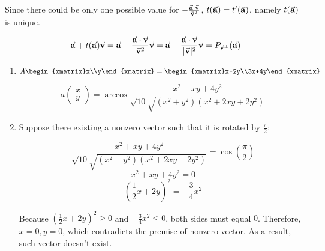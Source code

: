 \begin{exercise}{24}
\begin{enumerate}
         Since there could be only one possible value for $-\frac{\vec{\mathbf{a}} \cdot \vec{\mathbf{v}}}{\vec{\mathbf{v}}^2}$, $t(\vec{\mathbf{a}}) = t'(\vec{\mathbf{a}})$, namely $t(\vec{\mathbf{a}})$ is unique.
         
        $$\vec{\mathbf{a}} + t(\vec{\mathbf{a}})\vec{\mathbf{v}} = \vec{\mathbf{a}} -\frac{\vec{\mathbf{a}} \cdot \vec{\mathbf{v}}}{\vec{\mathbf{v}}^2}\vec{\mathbf{v}} = \vec{\mathbf{a}} - \frac{\vec{\mathbf{a}} \cdot \vec{\mathbf{v}}}{|\vec{\mathbf{v}}|^2}\vec{\mathbf{v}} = P_{\vec{\mathbf{v}}^{\bot}}(\vec{\mathbf{a}})$$
        
        \rQED
  \end{enumerate}
\end{exercise}

\begin{exercise}{26}
  \begin{enumerate}
    \item $$A\begin{xmatrix}x\\y\end{xmatrix} = \begin{xmatrix}x-2y\\3x+4y\end{xmatrix}$$
    
          $$a\begin{pmatrix}x\\y\end{pmatrix} = \arccos{\frac{x^2+xy+4y^2} {\sqrt{10}\sqrt{(x^2+y^2) (x^2+2xy+2y^2)}}}$$
          
    \item Suppose there existing a nonzero vector such that it is rotated by $\frac{\pi}{2}$:
    
          $$\frac{x^2+xy+4y^2} {\sqrt{10}\sqrt{(x^2+y^2) (x^2+2xy+2y^2)}} = \cos(\frac{\pi}{2})$$
          $$x^2+xy+4y^2=0$$
          $$(\frac{1}{2}x+2y)^2=-\frac{3}{4}x^2$$
          
          Because $(\frac{1}{2}x+2y)^2 \geq 0$ and $-\frac{3}{4}x^2 \leq 0$, both sides must equal $0$. Therefore, $x = 0, y = 0$, which contradicts the premise of nonzero vector. As a result, such vector doesn't exist.
  \end{enumerate}
\end{exercise}
